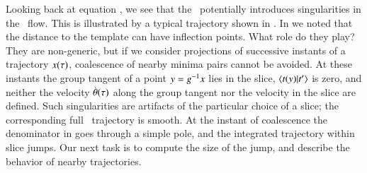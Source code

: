 Looking back at equation ,
we see that the \mslices\ potentially introduces singularities
in the \reducedsp\ flow.
This is illustrated by a typical trajectory
shown in .
%
In  we noted that the distance to the template
can have inflection points.
What role do they play? They are non-generic, but
if we consider projections of successive instants of a trajectory
$x(\tau)$, coalescence of
nearby minima pairs cannot be avoided.
At these instants the group tangent of a point
$y=g^{-1} x$ lies in the slice, $\braket{\groupTan(\sspRed)}{\sliceTan{}}$ is zero,
and neither the velocity $\dot{{\bf \theta}}(\tau)$ along the group tangent
nor the velocity in the slice are defined.
Such singularities are artifacts of the particular choice of
a slice; the corresponding full \statesp\ trajectory is smooth. At the instant of coalescence
the denominator in  goes through a simple pole,
and the integrated trajectory within slice jumps. Our next task is
to compute the size of the jump, and describe the behavior of
nearby trajectories.



